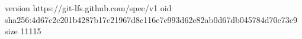 version https://git-lfs.github.com/spec/v1
oid sha256:4d67c2c201b4287b17c21967d8c116e7e993d62e82ab0d67db045784d70c73c9
size 11115
